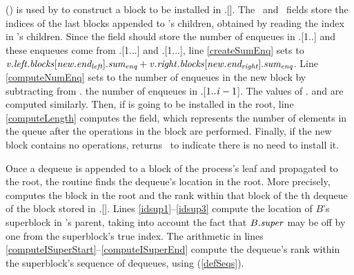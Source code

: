 () is used
by  to construct a block to be installed in .[].
The \eleft\ and \eright\ fields store the indices of the last blocks appended to 's
children, obtained by reading the  index in 's children.
Since the  field should store the number of enqueues in
.[1..] and these enqueues come from .[1...\eleft] and .[1...\eright], line \ref{createSumEnq} sets
 to $\mbox{\textnormal{\textit{v}}}.\mbox{\textit{left.blocks}}[\mbox{\textnormal{\textit{new}}}.\mbox{\textit{end\textsubscript{left}}}].\mbox{\textit{sum\textsubscript{enq}}} + \mbox{\textnormal{\textit{v}}}.\mbox{\textit{right}}.\mbox{\textit{blocks}}[\mbox{\textnormal{\textit{new}}}.\mbox{\textit{end\textsubscript{right}}}].\mbox{\textit{sum\textsubscript{enq}}}$.
Line \ref{computeNumEnq} sets  to the number of enqueues in the new block by
subtracting from . the number of enqueues  in .[$1..\mbox{\textnormal{\textit{i}}}-1$].
The values of . and  are computed similarly.
Then, if 
is going to be installed in the root, line \ref{computeLength} computes the  field, which
represents the number of elements in the queue after the operations in the block are performed.
Finally, if the new block contains no operations,  returns \nl\ to indicate
 there is no need to install it.

Once a dequeue is appended to a block of the process's leaf and propagated to the root,
the  routine finds the dequeue's location in the root.
More precisely, 
computes the block in the root and the rank
within that block  of the th dequeue of the block  stored in .[].
Lines \ref{idsup1}--\ref{idsup3} compute the location of $B$'s superblock in 's parent, taking into account the fact that $B.\mbox{\textit{super}}$ may be off by one from the superblock's true index.
The arithmetic in lines \ref{computeISuperStart}--\ref{computeISuperEnd} compute the dequeue's 
rank within the superblock's sequence of dequeues, using  (\ref{defSeqs}).


